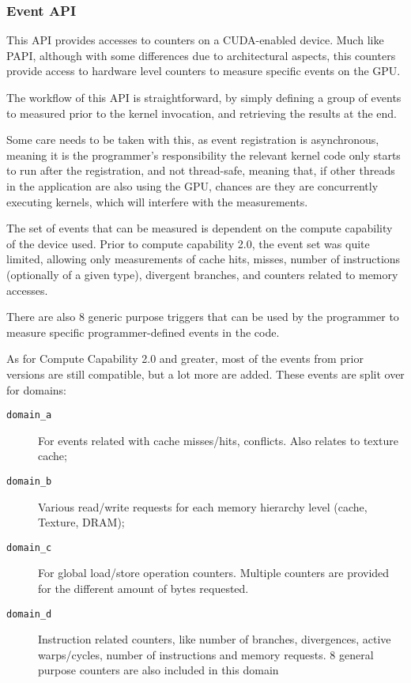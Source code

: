 \subsubsection{Event API}
\label{sec:cuda:prof:event}

This API provides accesses to counters on a CUDA-enabled device. Much like PAPI, although with some differences due to architectural aspects, this counters provide access to hardware level counters to measure specific events on the GPU.

The workflow of this API is straightforward, by simply defining a group of events to measured prior to the kernel invocation, and retrieving the results at the end.

Some care needs to be taken with this, as event registration is asynchronous, meaning it is the programmer's responsibility the relevant kernel code only starts to run after the registration, and not thread-safe, meaning that, if other threads in the application are also using the GPU, chances are they are concurrently executing kernels, which will interfere with the measurements.

The set of events that can be measured is dependent on the compute capability of the device used. Prior to compute capability 2.0, the event set was quite limited, allowing only measurements of cache hits, misses, number of instructions (optionally of a given type), divergent branches, and counters related to memory accesses.

There are also 8 generic purpose triggers that can be used by the programmer to measure specific programmer-defined events in the code.

As for Compute Capability 2.0 and greater, most of the events from prior versions are still compatible, but a lot more are added. These events are split over for domains:

\begin{description}
	\item[\texttt{domain\_a}] For events related with cache misses/hits, conflicts. Also relates to texture cache;

	\item[\texttt{domain\_b}] Various read/write requests for each memory hierarchy level (cache, Texture, DRAM);

	\item[\texttt{domain\_c}] For global load/store operation counters. Multiple counters are provided for the different amount of bytes requested.

	\item[\texttt{domain\_d}] Instruction related counters, like number of branches, divergences, active warps/cycles, number of instructions and memory requests. 8 general purpose counters are also included in this domain

\end{description}


